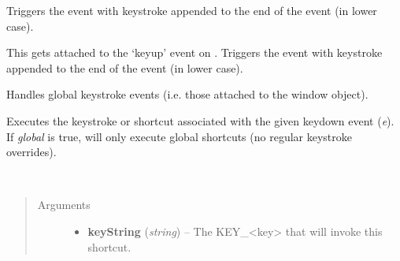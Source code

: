 \documentclass[letterpaper,10pt,openany]{sphinxmanual}
\begin{document}
\begin{fulllineitems}
\begin{fulllineitems}
Triggers the  event with keystroke appended to the end of the event (in lower case).

\end{fulllineitems}



\begin{fulllineitems}
\label{Developer/js_gateone:GateOne.Input.onGlobalKeyUp}
This gets attached to the `keyup' event on .  Triggers the  event with keystroke appended to the end of the event (in lower case).

\end{fulllineitems}



\begin{fulllineitems}
\label{Developer/js_gateone:GateOne.Input.onGlobalKeyDown}
Handles global keystroke events (i.e. those attached to the window object).

\end{fulllineitems}



\begin{fulllineitems}
\label{Developer/js_gateone:GateOne.Input.execKeystroke}
Executes the keystroke or shortcut associated with the given keydown event (\emph{e}).  If \emph{global} is true, will only execute global shortcuts (no regular keystroke overrides).

\end{fulllineitems}



\begin{fulllineitems}
\label{Developer/js_gateone:GateOne.Input.registerShortcut}~\begin{quote}\begin{description}
\item[{Arguments}] \leavevmode\begin{itemize}
\item {} 
\textbf{keyString} (\emph{string}) -- The KEY\_\textless{}key\textgreater{} that will invoke this shortcut.


\end{itemize}
\end{description}
\end{quote}
\end{fulllineitems}
\end{fulllineitems}
\end{document}
